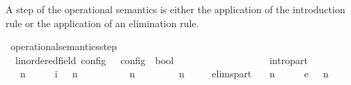 \begin{isabellebody}
\begin{isamarkuptext}
A step of the operational semantics is either the application of the introduction 
  rule or the application of an elimination rule.%
\end{isamarkuptext}\isamarkuptrue%
\isamarkupfalse%
\ operational{\isacharunderscore}semantics{\isacharunderscore}step\isanewline
\ \ {\isacharcolon}{\isacharcolon}{\isacartoucheopen}{\isacharparenleft}{\isacharprime}{\isasymtau}{\isacharcolon}{\isacharcolon}linordered{\isacharunderscore}field{\isacharparenright}\ config\ {\isasymRightarrow}\ {\isacharprime}{\isasymtau}\ config\ {\isasymRightarrow}\ bool{\isacartoucheclose}\ \ \ \ \ \ \ \ \ \ \ \ \ \ {\isacharparenleft}{\isacartoucheopen}{\isacharunderscore}\ {\isasymhookrightarrow}\ {\isacharunderscore}{\isacartoucheclose}\ {}{}{\isacharparenright}\isanewline
{}\isanewline
\ \ intro{\isacharunderscore}part{\isacharcolon}\isanewline
\ \ {\isacartoucheopen}{\isacharparenleft}{\isasymGamma}\ n\ {\isasymturnstile}\ {\isasymPsi}\ {\isasymtriangleright}\ {\isasymPhi}\ \ {\isasymhookrightarrow}\isactrlsub i\ \ {\isacharparenleft}{\isasymGamma}\ n\ {\isasymturnstile}\ {\isasymPsi}\ {\isasymtriangleright}\ {\isasymPhi}\isanewline
\ \ \ \ {\isasymLongrightarrow}\ {\isacharparenleft}{\isasymGamma}\ n\ {\isasymturnstile}\ {\isasymPsi}\ {\isasymtriangleright}\ {\isasymPhi}\ \ {\isasymhookrightarrow}\ \ {\isacharparenleft}{\isasymGamma}\ n\ {\isasymturnstile}\ {\isasymPsi}\ {\isasymtriangleright}\ {\isasymPhi}\isanewline
{\isacharbar}\ elims{\isacharunderscore}part{\isacharcolon}\isanewline
\ \ {\isacartoucheopen}{\isacharparenleft}{\isasymGamma}\ n\ {\isasymturnstile}\ {\isasymPsi}\ {\isasymtriangleright}\ {\isasymPhi}\ \ {\isasymhookrightarrow}\isactrlsub e\ \ {\isacharparenleft}{\isasymGamma}\ n\ {\isasymturnstile}\ {\isasymPsi}\ {\isasymtriangleright}\ {\isasymPhi}\isanewline

\end{isabellebody}
